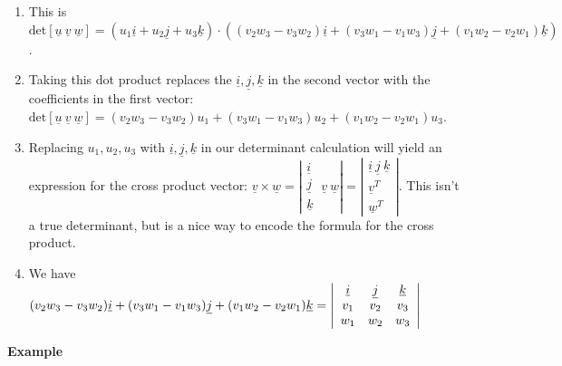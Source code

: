 \documentclass[12pt,letterpaper,noanswers]{exam}
\newcommand{\mb}[1]{\underline{#1}}
\begin{document}
\begin{enumerate}
    \item This is $\text{det}[\mb{u}\ \mb{v}\ \mb{w}]=(u_1\mb{i}+u_2\mb{j}+u_3\mb{k})\cdot((v_2w_3-v_3w_2)\mb{i}+(v_3w_1-v_1w_3)\mb{j}+(v_1w_2-v_2w_1)\mb{k})$.
    \item Taking this dot product replaces the $\mb{i},\mb{j},\mb{k}$ in the second vector with the coefficients in the first vector: $\text{det}[\mb{u}\ \mb{v}\ \mb{w}]=(v_2w_3-v_3w_2)u_1+(v_3w_1-v_1w_3)u_2+(v_1w_2-v_2w_1)u_3$.
    \item Replacing $u_1,u_2,u_3$ with $\mb{i},\mb{j},\mb{k}$ in our determinant calculation will yield an expression for the cross product vector: $\mb{v}\times\mb{w} = \left\vert \begin{array}{c} \mb{i} \\ \mb{j} \\ \mb{k}\end{array} \ \mb{v}\ \mb{w}\right\vert = \left\vert \begin{array}{c} \mb{i}\ \mb{j}\ \mb{k}\\ \mb{v}^T \\ \mb{w}^T \end{array}\right\vert$.  This isn't a true determinant, but is a nice way to encode the formula for the cross product.
    \item We have $(v_2w_3-v_3w_2)\mb{i}+(v_3w_1-v_1w_3)\mb{j}+(v_1w_2-v_2w_1)\mb{k} = \left\vert\begin{array}{c c c} \mb{i} & \mb{j} & \mb{k} \\ v_1 & v_2 & v_3 \\ w_1 & w_2 & w_3 \end{array}\right\vert$
\end{enumerate}

\noindent\textbf{Example}
\end{document}

